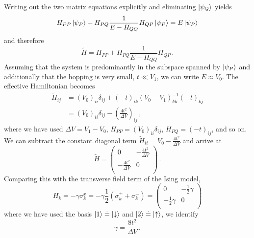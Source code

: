 %
Writing out the two matrix equations explicitly and eliminating $\left|\psi_Q\right>$
yields 
%
\begin{equation}
  H_{PP} \left|\psi_P\right> + H_{PQ} \frac{1}{E - H_{QQ}} H_{QP} \left|\psi_P\right>
  =
  E \left|\psi_P\right>
\end{equation}
%
and therefore
%
\begin{equation}
  \label{eq:H_effective}
  \tilde{H} = H_{PP} + H_{PQ} \frac{1}{E - H_{QQ}} H_{QP} \, .
\end{equation}
%
Assuming that the system is predominantly in the subspace spanned by
$\left|\psi_P\right>$ and additionally that the hopping is very small, $t \ll V_1$, we
can write $E \approx V_0$. The effective Hamiltonian becomes
%
\begin{equation}
\begin{split}
  \tilde{H}_{ij}
  &=
  \left( V_0 \right)_{ii} \delta_{ij}
  + \left( - t \right)_{ik}
    \left( V_0 - V_1 \right)^{-1}_{kk}
    \left( - t \right)_{kj} \\
  &=
  \left( V_0 \right)_{ii} \delta_{ij}
  - \left( \frac{4 t^2}{\Delta V} \right)_{ij} \, ,
\end{split}
\end{equation}
%
where we have used $\Delta V = V_1 - V_0$, $H_{PP} = \left( V_0 \right)_{ii} \delta_{ij}$, $H_{PQ} =
\left( -t \right)_{ij}$, and so on. We can subtract the constant diagonal term
$\tilde{H}_{ii} = V_0 - \frac{4 t^2}{\Delta V}$ and arrive at
%
\begin{equation}
  \tilde{H}
  =
  \begin{pmatrix}
    0 & - \frac{4 t^2}{\Delta V} \\
    - \frac{4 t^2}{\Delta V} & 0 \\
  \end{pmatrix} \, .
\end{equation}
%
Comparing this with the transverse field term of the Ising model, 
%
\begin{equation}
  H_k = - \gamma \sigma^x_k = - \gamma \frac{1}{2} \left( \sigma^+_k + \sigma^-_k \right)
  = 
  \begin{pmatrix}
    0 & - \frac{1}{2} \gamma \\
    - \frac{1}{2} \gamma & 0 \\
  \end{pmatrix}
\end{equation}
%
where we have used the basis $\left|1\right> \doteq \left|\downarrow\right>$ and $\left|2\right>
\doteq \left|\uparrow\right>$, we identify
%
\begin{equation}
  \gamma = \frac{8 t^2}{\Delta V} \, .
\end{equation}
%

